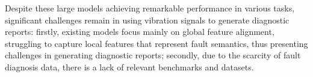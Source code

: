 Despite these large models achieving remarkable performance in various tasks, significant challenges remain in using vibration signals to generate diagnostic reports: firstly, existing models focus mainly on global feature alignment, struggling to capture local features that represent fault semantics, thus presenting challenges in generating diagnostic reports; secondly, due to the scarcity of fault diagnosis data, there is a lack of relevant benchmarks and datasets.